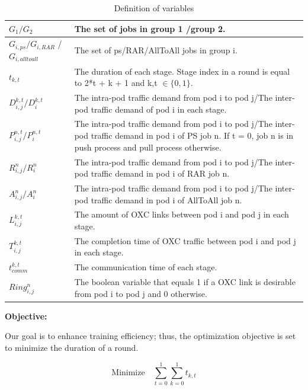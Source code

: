 \documentclass[conference]{IEEEtran}
\begin{document}
\begin{table}[]
	\caption{Definition of variables}
	\label{tbl_1}
	\begin{tabular}{p{1.5cm}<{\centering}p{6.5cm}}
		\toprule
		$G_1/G_2$ & The set of jobs in group 1 /group 2.\\
		\midrule
		$G_{i,ps}/G_{i,RAR}$ /$G_{i,alltoall}$ & The set of ps/RAR/AllToAll jobs in group i.\\
		\midrule
		$t_{k,t}$ & The duration of each stage. Stage index in a round is equal to 2*t + k + 1 and k,t $\in \{0, 1\}$.\\
		\midrule
		$D_{i,j}^{k,t}/D_i^{k,t}$ & The intra-pod traffic demand from pod i to pod j/The inter-pod traffic demand of pod i in each stage.\\
		\midrule
		$P_{i,j}^{n,t}/P_i^{n,t}$ & The intra-pod traffic demand from pod i to pod j/The inter-pod traffic demand in pod i of PS job n. If t = 0, job n is in push process and pull process otherwise.\\
		\midrule
		$R_{i,j}^n/R_i^n$ & The intra-pod traffic demand from pod i to pod j/The inter-pod traffic demand in pod i of RAR job n.\\
		\midrule
		$A_{i,j}^n/A_i^n$ & The intra-pod traffic demand from pod i to pod j/The inter-pod traffic demand in pod i of AllToAll job n.\\
		\midrule
		$L_{i,j}^{k,t}$ & The amount of OXC links between pod i and pod j in each stage.\\
		\midrule
		$T_{i,j}^{k,t}$ & The completion time of OXC traffic between pod i and pod j in each stage.\\
		\midrule
		$t_{comm}^{k,t}$ & The communication time of each stage.\\
		\midrule
		$Ring_{i,j}^n $ & The boolean variable that equals 1 if a OXC link is desirable from pod i to pod j and 0 otherwise.\\
		\midrule
	\end{tabular}
\end{table}

\textbf{Objective:}

Our goal is to enhance training efficiency; thus, the optimization objective is set to minimize the duration of a round.

\begin{equation} \label{eq:1}
	\text{Minimize} \quad \sum_{t=0}^{1}\sum_{k=0}^{1}t_{k,t}
\end{equation}
\end{document}

